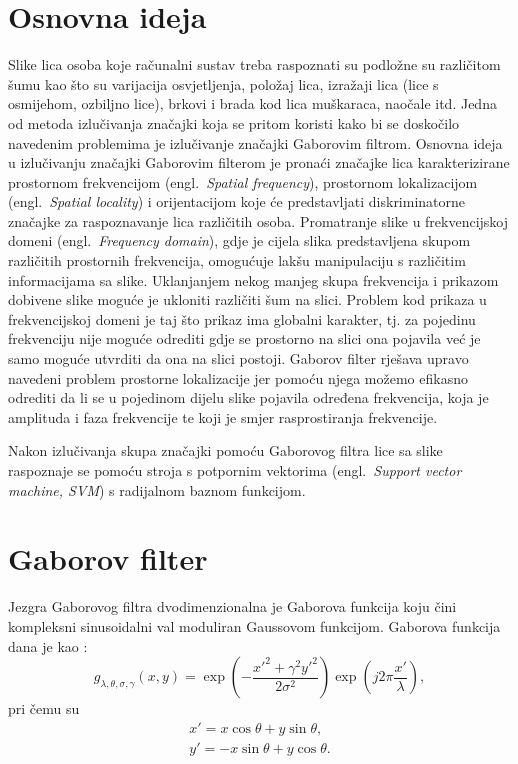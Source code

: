 \documentclass{article}
\newcommand{\engl}[1]{(engl.~\emph{#1})}
\begin{document}
\section{Osnovna ideja}
Slike lica osoba koje računalni sustav treba raspoznati su podložne su različitom
šumu kao što su varijacija osvjetljenja, položaj lica, izražaji lica (lice s
osmijehom, ozbiljno lice), brkovi i brada kod lica muškaraca, naočale itd. Jedna
od metoda izlučivanja značajki koja se pritom koristi kako bi se doskočilo
navedenim problemima je izlučivanje značajki Gaborovim filtrom. Osnovna ideja u
izlučivanju značajki Gaborovim filterom je pronaći značajke lica karakterizirane
prostornom frekvencijom \engl{Spatial frequency}, prostornom lokalizacijom
\engl{Spatial locality} i orijentacijom koje će predstavljati diskriminatorne
značajke za raspoznavanje lica različitih osoba. Promatranje slike u
frekvencijskoj domeni \engl{Frequency domain}, gdje je cijela slika predstavljena
skupom različitih prostornih frekvencija, omogućuje lakšu manipulaciju s
različitim informacijama sa slike. Uklanjanjem nekog manjeg skupa frekvencija i
prikazom dobivene slike moguće je ukloniti različiti šum na slici. Problem kod
prikaza u frekvencijskoj domeni je taj što prikaz ima globalni karakter, tj. za
pojedinu frekvenciju nije moguće odrediti gdje se prostorno na slici ona pojavila
već je samo moguće utvrditi da ona na slici postoji. Gaborov filter rješava
upravo navedeni problem prostorne lokalizacije jer pomoću njega možemo efikasno
odrediti da li se u pojedinom dijelu slike pojavila određena frekvencija, koja
je amplituda i faza frekvencije te koji je smjer rasprostiranja frekvencije.

Nakon izlučivanja skupa značajki pomoću Gaborovog filtra lice sa slike raspoznaje
se pomoću stroja s potpornim vektorima \engl{Support vector machine,
SVM} s radijalnom baznom funkcijom.

\section{Gaborov filter}

Jezgra Gaborovog filtra dvodimenzionalna je Gaborova funkcija koju čini
kompleksni sinusoidalni val moduliran Gaussovom funkcijom. Gaborova funkcija
dana je kao \citep{petkovgabor}:
\begin{equation}
g_{\lambda,\theta,\sigma,\gamma}(x,y) = \exp\left ( -
\frac{x'^2+\gamma^2 y'^2}{2\sigma^2}\right ) \exp \left ( j2\pi
\frac{x'}{\lambda} \right ),
\label{2d-gabor}
\end{equation}
pri čemu su
\begin{eqnarray*}
x' = x \cos \theta + y \sin \theta, \\
y' = -x \sin \theta + y \cos \theta.
\end{eqnarray*}
\end{document}

